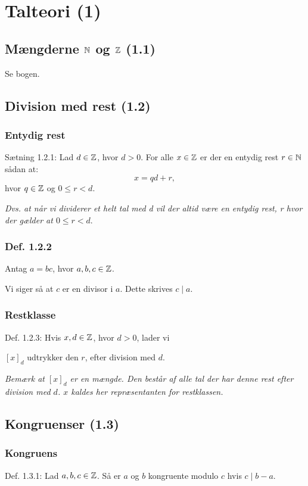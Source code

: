 \section{Talteori (1)}
\subsection{Mængderne $\mathbb{N}$ og $\mathbb{Z}$ (1.1)}
Se bogen.

\subsection{Division med rest (1.2)}
\subsubsection{Entydig rest}
\label{Entydig rest}
Sætning 1.2.1: Lad $d \in \mathbb{Z}$, hvor $d > 0$. For alle $x \in \mathbb{Z}$ er der en
entydig rest $r \in \mathbb{N}$ sådan at:
\begin{equation*}
  x = qd + r,
\end{equation*}
hvor $q \in \mathbb{Z}$ og $0 \leq r < d$.

\textit{Dvs. at når vi dividerer et helt tal med d vil der altid være en entydig
rest, r hvor der gælder at $0 \leq r < d$}.

\subsubsection{Def. 1.2.2}
Antag $a = bc$, hvor $a, b, c \in \mathbb{Z}$.

Vi siger så at $c$ er en divisor i $a$. Dette skrives $c \mid a$.

\subsubsection{Restklasse}
\label{Restklasse}
Def. 1.2.3: Hvis $x, d \in \mathbb{Z}$, hvor $d > 0$, lader vi

$[x]_d$ udtrykker den  $r$, efter division med $d$.

\textit{Bemærk at $[x]_d$ er en mængde. Den består af alle tal der har denne
rest efter division med $d$. $x$ kaldes her repræsentanten for restklassen.}


\subsection{Kongruenser (1.3)}
\subsubsection{Kongruens}
\label{Kongruens}
Def. 1.3.1: Lad $a, b, c \in \mathbb{Z}$. Så er $a$ og $b$ kongruente modulo $c$ hvis
$c \mid b - a$. 

